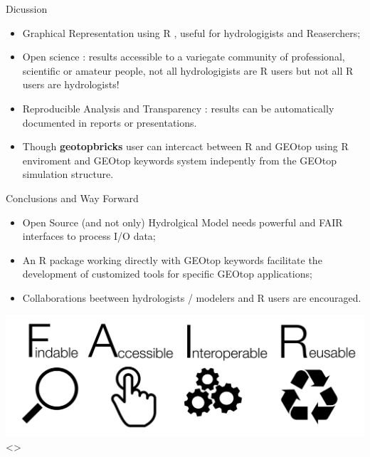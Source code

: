 \documentclass[ignorenonframetext,]{beamer}
\providecommand{\tightlist}{%
  \setlength{\itemsep}{0pt}\setlength{\parskip}{0pt}}
\begin{document}
\begin{frame}{Dicussion}

\begin{itemize}
\tightlist
\item
  Graphical Representation using R , useful for hydrologigists and
  Reaserchers;
\item
  Open science : results accessible to a variegate community of
  professional, scientific or amateur people, not all hydrologigists are
  R users but not all R users are hydrologists!
\item
  Reproducible Analysis and Transparency : results can be automatically
  documented in reports or presentations.
\item
  Though \textbf{geotopbricks} user can intercact between R and GEOtop
  using R enviroment and GEOtop keywords system indepently from the
  GEOtop simulation structure.
\end{itemize}

\end{frame}

\begin{frame}{Conclusions and Way Forward}

\begin{itemize}
\item
  Open Source (and not only) Hydrolgical Model needs powerful and FAIR
  interfaces to process I/O data;
\item
  An R package working directly with GEOtop keywords facilitate the
  development of customized tools for specific GEOtop applications;
\item
  Collaborations beetween hydrologists / modelers and R users are
  encouraged.
\end{itemize}

\includegraphics{resources/images/FAIR_data_principles.jpg}\textless{}\center\textgreater{}

\end{frame}
\end{document}
